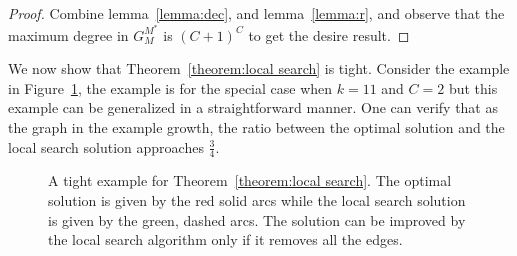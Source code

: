 \begin{proof}
Combine lemma~\ref{lemma:dec}, and lemma~\ref{lemma:r}, 
and observe that the maximum degree in $G^{M^*}_M$ is $(C + 1)^C$ to
get the desire result.
\end{proof}

We now show that Theorem~\ref{theorem:local search} is tight.
Consider the example in Figure~\ref{fig:local search tight},
the example is for the special case when $k=11$ and $C=2$ but this example can
be generalized in a straightforward manner.
One can verify that as the graph in the example growth, 
the ratio between the optimal solution and the local search solution approaches
$\frac{3}{4}$.
\begin{figure}
\begin{center}
\caption{
\label{fig:local search tight}
A tight example for Theorem~\ref{theorem:local search}. 
The optimal solution is given by the red solid arcs while the local search
solution is given by the green, dashed arcs.
The solution can be improved by the local search algorithm only if it removes
all the edges. 
}

\end{center}
\end{figure}


